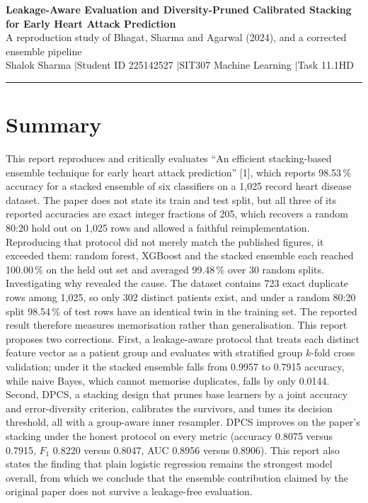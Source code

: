 \documentclass[11pt,a4paper]{article}
\begin{document}
\begin{center}
{\Large\bfseries Leakage-Aware Evaluation and Diversity-Pruned Calibrated
Stacking for Early Heart Attack Prediction}\\[5pt]
{\normalsize A reproduction study of Bhagat, Sharma and Agarwal (2024),
and a corrected ensemble pipeline}\\[10pt]
{\normalsize Shalok Sharma \quad$|$\quad Student ID 225142527
\quad$|$\quad SIT307 Machine Learning \quad$|$\quad Task 11.1HD}
\end{center}
\rule{\textwidth}{0.8pt}

\section*{Summary}
This report reproduces and critically evaluates ``An efficient stacking-based
ensemble technique for early heart attack prediction'' [1], which
reports 98.53\,\% accuracy for a stacked ensemble of six classifiers on a
1{,}025 record heart disease dataset. The paper does not state its train and test
split, but all three of its reported accuracies are exact integer fractions of
205, which recovers a random 80:20 hold out on 1{,}025 rows and allowed a faithful
reimplementation. Reproducing that protocol did not merely match the published
figures, it exceeded them: random forest, XGBoost and the stacked ensemble each
reached 100.00\,\% on the held out set and averaged 99.48\,\% over 30 random
splits. Investigating why revealed the cause. The dataset contains 723 exact
duplicate rows among 1{,}025, so only 302 distinct patients exist, and under a
random 80:20 split 98.54\,\% of test rows have an identical twin in the training
set. The reported result therefore measures memorisation rather than
generalisation. This report proposes two corrections. First, a leakage-aware protocol that
treats each distinct feature vector as a patient group and evaluates with
stratified group $k$-fold cross validation; under it the stacked ensemble falls
from 0.9957 to 0.7915 accuracy, while naive Bayes, which cannot memorise
duplicates, falls by only 0.0144. Second, DPCS, a stacking design that prunes
base learners by a joint accuracy and error-diversity criterion, calibrates the
survivors, and tunes its decision threshold, all with a group-aware inner
resampler. DPCS improves on the paper's stacking under the honest protocol on
every metric (accuracy 0.8075 versus 0.7915, $F_1$ 0.8220 versus 0.8047, AUC
0.8956 versus 0.8906). This report also states the finding that plain
logistic regression remains the strongest model overall, from which we conclude
that the ensemble contribution claimed by the original paper does not survive a
leakage-free evaluation.
\end{document}
